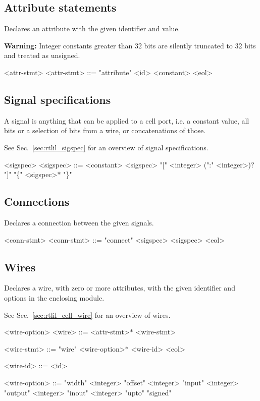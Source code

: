 \subsection{Attribute statements}

Declares an attribute with the given identifier and value.

\textbf{Warning:} Integer constants greater than 32 bits are silently truncated to 32 bits and treated as unsigned.

\begin{indentgrammar}{<attr-stmt>}
<attr-stmt> ::= "attribute" <id> <constant> <eol>
\end{indentgrammar}

\subsection{Signal specifications}

A signal is anything that can be applied to a cell port, i.e. a constant value, all bits or a selection of bits from a wire, or concatenations of those.

See Sec.~\ref{sec:rtlil_sigspec} for an overview of signal specifications.

\begin{indentgrammar}{<sigspec>}
<sigspec> ::=
<constant>
    \alt <sigspec> "[" <integer> (":" <integer>)$?$ "]"
    \alt "\{" <sigspec>$*$ "\}"
\end{indentgrammar}

\subsection{Connections}

Declares a connection between the given signals.

\begin{indentgrammar}{<conn-stmt>}
<conn-stmt> ::= "connect" <sigspec> <sigspec> <eol>
\end{indentgrammar}

\subsection{Wires}

Declares a wire, with zero or more attributes, with the given identifier and options in the enclosing module.

See Sec.~\ref{sec:rtlil_cell_wire} for an overview of wires.

\begin{indentgrammar}{<wire-option>}
<wire> ::= <attr-stmt>$*$ <wire-stmt>

<wire-stmt> ::= "wire" <wire-option>$*$ <wire-id> <eol>

<wire-id> ::= <id>

<wire-option> ::= 
"width" <integer>
  \alt "offset" <integer>
  \alt "input" <integer>
  \alt "output" <integer>
  \alt "inout" <integer>
  \alt "upto"
  \alt "signed"
\end{indentgrammar}

